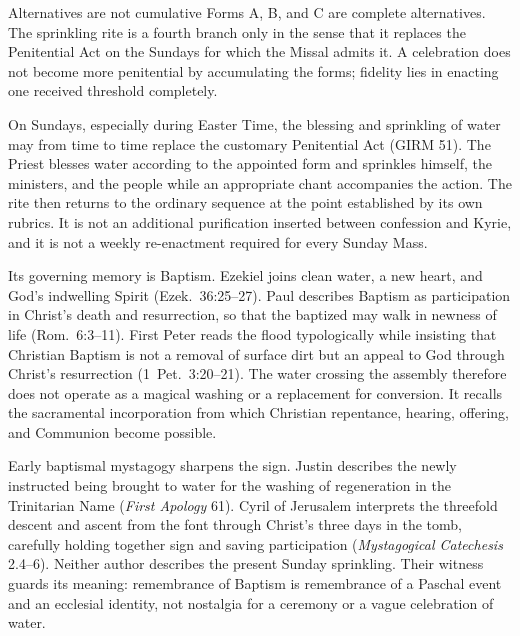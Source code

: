 \begin{studybox}{Alternatives are not cumulative}
Forms A, B, and C are complete alternatives. The sprinkling rite is a fourth branch only in the sense that it replaces the Penitential Act on the Sundays for which the Missal admits it. A celebration does not become more penitential by accumulating the forms; fidelity lies in enacting one received threshold completely.
\end{studybox}


On Sundays, especially during Easter Time, the blessing and sprinkling of water may from time to time replace the customary Penitential Act (GIRM 51). The Priest blesses water according to the appointed form and sprinkles himself, the ministers, and the people while an appropriate chant accompanies the action. The rite then returns to the ordinary sequence at the point established by its own rubrics. It is not an additional purification inserted between confession and Kyrie, and it is not a weekly re-enactment required for every Sunday Mass.

Its governing memory is Baptism. Ezekiel joins clean water, a new heart, and God's indwelling Spirit (Ezek.~36:25--27). Paul describes Baptism as participation in Christ's death and resurrection, so that the baptized may walk in newness of life (Rom.~6:3--11). First Peter reads the flood typologically while insisting that Christian Baptism is not a removal of surface dirt but an appeal to God through Christ's resurrection (1~Pet.~3:20--21). The water crossing the assembly therefore does not operate as a magical washing or a replacement for conversion. It recalls the sacramental incorporation from which Christian repentance, hearing, offering, and Communion become possible.

Early baptismal mystagogy sharpens the sign. Justin describes the newly instructed being brought to water for the washing of regeneration in the Trinitarian Name (\emph{First Apology} 61). Cyril of Jerusalem interprets the threefold descent and ascent from the font through Christ's three days in the tomb, carefully holding together sign and saving participation (\emph{Mystagogical Catechesis} 2.4--6). Neither author describes the present Sunday sprinkling. Their witness guards its meaning: remembrance of Baptism is remembrance of a Paschal event and an ecclesial identity, not nostalgia for a ceremony or a vague celebration of water.

